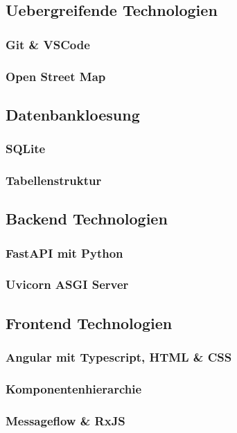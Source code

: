 \documentclass[../main.tex]{subfiles}
\begin{document}
\subsection{Uebergreifende Technologien} %
\subsubsection{Git \& VSCode}
\subsubsection{Open Street Map}

\subsection{Datenbankloesung} %
\subsubsection{SQLite}
\subsubsection{Tabellenstruktur}

\subsection{Backend Technologien} %
\subsubsection{FastAPI mit Python}
\subsubsection{Uvicorn ASGI Server}

\subsection{Frontend Technologien} %
\subsubsection{Angular mit Typescript, HTML \& CSS}
\subsubsection{Komponentenhierarchie}
\subsubsection{Messageflow \& RxJS}
\end{document}
